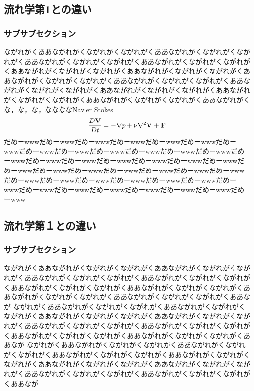 \documentclass[uplatex,12pt]{jsbook}
\begin{document}
	\subsection{流れ学第1との違い}
	\subsubsection{サブサブセクション}
	ながれがくああながれがくながれがくながれがくああながれがくながれがくながれがくああながれがくながれがくながれがくああながれがくながれがくながれがくああながれがくながれがくながれがくああながれがくながれがくながれがくああながれがくながれがくながれがくああながれがくながれがくながれがくああながれがくながれがくながれがくああながれがくながれがくながれがくああながれがくながれがくながれがくああながれがくながれがくながれがくああながれがくな，な，な，ななななNavier Stokes
	\[
		\frac{D\bf V}{Dt} = -\nabla p + \nu\nabla^2\bf V + \bf F
	\]だめーwwwだめーwwwだめーwwwだめーwwwだめーwwwだめーwwwだめーwwwだめーwwwだめーwwwだめーwwwだめーwwwだめーwwwだめーwwwだめーwwwだめーwwwだめーwwwだめーwwwだめーwwwだめーwwwだめーwwwだめーwwwだめーwwwだめーwwwだめーwwwだめーwwwだめーwwwだめーwwwだめーwwwだめーwwwだめーwwwだめーwwwだめーwwwだめーwwwだめーwwwだめーwwwだめーwwwだめーwwwだめーwwwだめーwwwだめーwwwだめーwww
	\subsection{流れ学第１との違い}
	\subsubsection{サブサブセクション}
	ながれがくああながれがくながれがくながれがくああながれがくながれがくながれがくああながれがくながれがくながれがくああながれがくながれがくながれがくああながれがくながれがくながれがくああながれがくながれがくながれがくああながれがくながれがくながれがくああながれがくながれがくながれがくああなが
	ながれがくああながれがくながれがくながれがくああながれがくながれがくながれがくああながれがくながれがくながれがくああながれがくながれがくながれがくああながれがくながれがくながれがくああながれがくながれがくながれがくああながれがくながれがくながれがくああながれがくながれがくながれがくああなが
	ながれがくああながれがくながれがくながれがくああながれがくながれがくながれがくああながれがくながれがくながれがくああながれがくながれがくながれがくああながれがくながれがくながれがくああながれがくながれがくながれがくああながれがくながれがくながれがくああながれがくながれがくながれがくああなが
	
\end{document}
